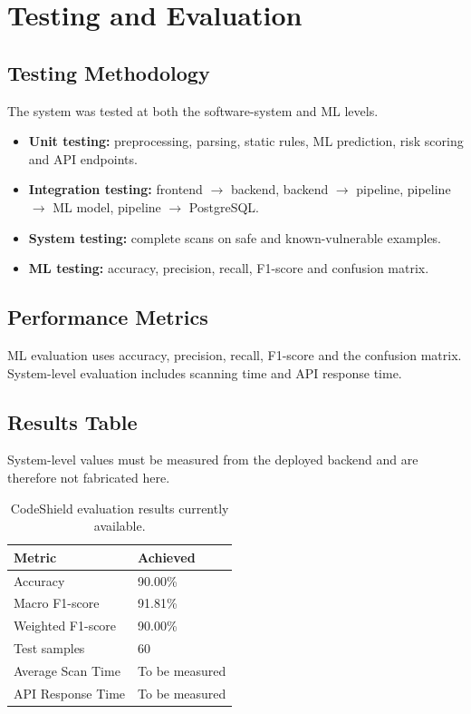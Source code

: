\documentclass[12pt,a4paper]{report}
\begin{document}
\chapter{Testing and Evaluation}

\section{Testing Methodology}
The system was tested at both the software-system and ML levels.
\begin{itemize}[noitemsep]
  \item \textbf{Unit testing:} preprocessing, parsing, static rules, ML prediction, risk scoring and API endpoints.
  \item \textbf{Integration testing:} frontend $\rightarrow$ backend, backend $\rightarrow$ pipeline, pipeline $\rightarrow$ ML model, pipeline $\rightarrow$ PostgreSQL.
  \item \textbf{System testing:} complete scans on safe and known-vulnerable examples.
  \item \textbf{ML testing:} accuracy, precision, recall, F1-score and confusion matrix.
\end{itemize}

\section{Performance Metrics}
ML evaluation uses accuracy, precision, recall, F1-score and the confusion matrix. System-level evaluation includes scanning time and API response time.

\section{Results Table}
System-level values must be measured from the deployed backend and are therefore not fabricated here.

\begin{table}[H]
\centering
\caption{CodeShield evaluation results currently available.}
\begin{tabular}{ll}
\toprule
\textbf{Metric} & \textbf{Achieved}\\
\midrule
Accuracy & 90.00\%\\
Macro F1-score & 91.81\%\\
Weighted F1-score & 90.00\%\\
Test samples & 60\\
Average Scan Time & To be measured\\
API Response Time & To be measured\\
\bottomrule
\end{tabular}
\end{table}
\end{document}
